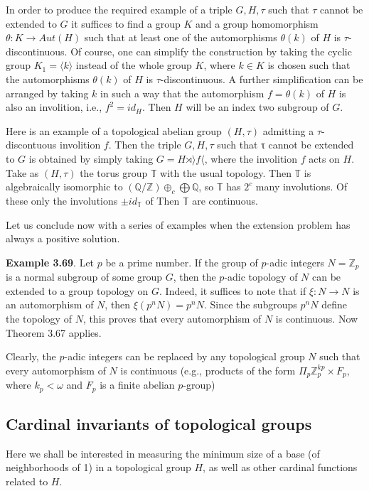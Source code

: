 \documentclass[12pt]{article}
\begin{document}
    In order to produce the required example of a triple $G, H, \tau$ such that $\tau$ cannot be extended to $G$ it suffices
to find a group $K$ and a group homomorphism $\theta : K \to Aut(H)$ such that at least one of the automorphisms
$\theta(k)$ of $H$ is $\tau$-discontinuous. Of course, one can simplify the construction by taking the cyclic group $K_1 = \langle k \rangle$
instead of the whole group $K$, where $k \in K$ is chosen such that the automorphisms $\theta(k)$ of $H$ is $\tau$-discontinuous.
A further simplification can be arranged by taking $k$ in such a way that the automorphism $f = \theta(k)$ of $H$ is
also an involition, i.e., $f^2 = id_H$. Then $H$ will be an index two subgroup of $G$.


    Here is an example of a topological abelian group $(H, \tau)$ admitting a $\tau$-discontuous involition $f$. Then the
triple $G, H, \tau$ such that τ cannot be extended to $G$ is obtained by simply taking $G = H \rtimes \rangle f \langle$, where the involition
$f$ acts on $H$. Take as $(H, \tau)$ the torus group $\mathbb{T}$ with the usual topology. Then $\mathbb{T}$ is algebraically isomorphic to
$(\mathbb{Q}/\mathbb{Z}) \oplus_c \bigoplus \mathbb{Q}$, so $\mathbb{T}$ has $2^c$ many involutions. Of these only the involutions $\pm id_\mathbb{T}$  of Then $\mathbb{T}$  are continuous.


    Let us conclude now with a series of examples when the extension problem has always a positive solution.


\textbf{Example 3.69}. Let $p$ be a prime number. If the group of $p$-adic integers $N = \mathbb{Z}_p$ is a normal subgroup of
some group $G$, then the $p$-adic topology of $N$ can be extended to a group topology on $G$. Indeed, it suffices to
note that if $\xi : N \to N$ is an automorphism of $N$, then $\xi(p^n N) = p^n N$. Since the subgroups $p^n N$ define the
topology of $N$, this proves that every automorphism of $N$ is continuous. Now Theorem 3.67 applies.


    Clearly, the $p$-adic integers can be replaced by any topological group $N$ such that every automorphism of $N$
is continuous (e.g., products of the form $\Pi_p \mathbb{Z}^{kp}_p \times F_p$, where $k_p < \omega$ and $F_p$ is a finite abelian $p$-group)


\subsection{Cardinal invariants of topological groups}
Here we shall be interested in measuring the minimum size of a base (of neighborhoods of 1) in a topological
group $H$, as well as other cardinal functions related to $H$.
\end{document}
